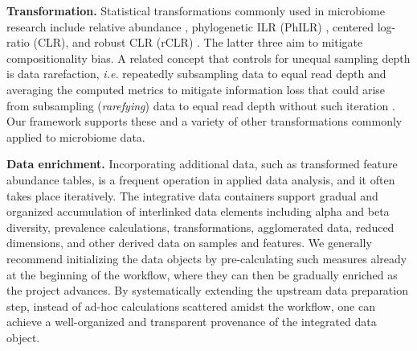 \documentclass[
  sn-nature,
]{sn-jnl}
\begin{document}
\textbf{Transformation.} Statistical transformations commonly used in
microbiome research include relative abundance \citep{gloor2017},
phylogenetic ILR (PhILR) \citep{silverman2017}, centered log-ratio
(CLR), and robust CLR (rCLR) \citep{martino2019}. The latter three aim
to mitigate compositionality bias. A related concept that controls for
unequal sampling depth is data rarefaction, \emph{i.e.} repeatedly
subsampling data to equal read depth and averaging the computed metrics
to mitigate information loss \citep{schloss2024b} that could arise from
subsampling (\emph{rarefying}) data to equal read depth without such
iteration \citep{mcmurdie2014, schloss2024, willis2019b}. Our framework
supports these and a variety of other transformations commonly applied
to microbiome data.

\textbf{Data enrichment.} Incorporating additional data, such as
transformed feature abundance tables, is a frequent operation in applied
data analysis, and it often takes place iteratively. The integrative
data containers support gradual and organized accumulation of
interlinked data elements including alpha and beta diversity, prevalence
calculations, transformations, agglomerated data, reduced dimensions,
and other derived data on samples and features. We generally recommend
initializing the data objects by pre-calculating such measures already
at the beginning of the workflow, where they can then be gradually
enriched as the project advances. By systematically extending the
upstream data preparation step, instead of ad-hoc calculations scattered
amidst the workflow, one can achieve a well-organized and transparent
provenance of the integrated data object.
\end{document}
